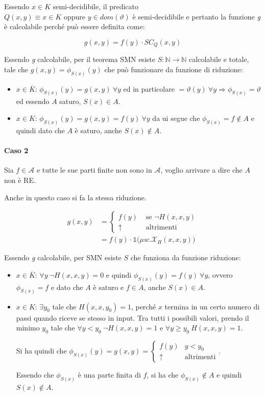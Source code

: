 Essendo $x \in K$ semi-decidibile, il predicato $Q(x,y) \equiv x \in K \text{ oppure } y \in dom(\vartheta)$ è semi-decidibile e pertanto la funzione \textit{g} è calcolabile perché può essere definita come:

$$
g(x,y) = f(y) \cdot SC_Q(x,y)
$$

Essendo \textit{g} calcolabile, per il teorema SMN esiste $S : \mathbb{N} \rightarrow \mathbb{N}$ calcolabile e totale, tale che $g(x,y)  = \phi_{S(x)}(y)$ che può funzionare da funzione di riduzione:

\begin{itemize}
	\item $x \in \overline{K}$: $\phi_{S(x)}(y) = g(x,y) \:\forall y$ ed in particolare $ =  \vartheta(y) \: \forall y \Rightarrow \phi_{S(x)} = \vartheta$ ed essendo $A$ saturo, $S(x) \in A$.
	\item $x \in K$: $\phi_{S(x)}(y) = g(x,y) = f(y)\:\forall y$ da ui segue che $\phi_{S(x)} = f \notin A$ e quindi dato che $A$ è saturo, anche $S(x) \notin A$.
\end{itemize}

\paragraph{Caso 2}

Sia $f \in \mathcal{A}$ e tutte le sue parti finite non sono in $\mathcal{A}$, voglio arrivare a dire che $A$ non è RE.

Anche in questo caso si fa la stessa riduzione.

\begin{align*}
g(x,y) &= \begin{cases}
f(y) &\text{ se } \neg H(x,x,y) \\
\uparrow & \text{ altrimenti}
\end{cases} \\
&= f(y) \cdot \mathbb{1} \big( \mu w . \mathcal{X}_H (x,x,y) \big)
\end{align*}

Essendo \textit{g} calcolabile, per SMN esiste $S$ che funziona da funzione riduzione:

\begin{itemize}
	\item $x \in \overline{K}$: $\forall y \: \neg H(x,x,y) = 0$ e quindi $\phi_{S(x)}(y) = f(y) \: \forall y$, ovvero $\phi_{S(x)} = f$ e dato che $A$ è saturo e $f \in A$, anche $S(x) \in A$.
	\item $x \in K$: $\exists y_0$ tale che $H(x,x,y_0) = 1$, perché $x$ termina in un certo numero di passi quando riceve se stesso in input. Tra tutti i possibili valori, prendo il minimo $y_0$ tale che $\forall y < y_0 \: \neg H(x,x,y) = 1$ e $\forall y \geq y_0 \: H(x,x,y) = 1 $.
	
	Si ha quindi che $\phi_{S(x)} (y) = g(x,y) = \begin{cases}
	f(y) &y < y_0 \\ 
	\uparrow &\text{altrimenti}
	\end{cases} $.
	
	Essendo che $\phi_{S(x)}$ è una parte finita di $f$, si ha che $\phi_{S(x)} \notin A$ e quindi $S(x) \notin A$. 
\end{itemize}

